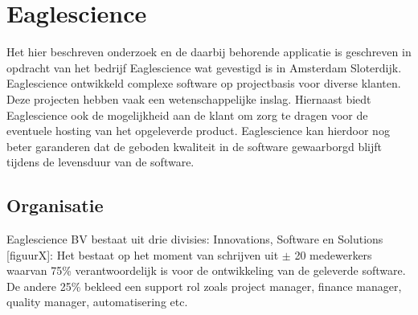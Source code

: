 \chapter{Eaglescience} %

\label{ch:Eaglescience} %


Het hier beschreven onderzoek en de daarbij behorende applicatie is geschreven in opdracht van het bedrijf Eaglescience wat gevestigd is in Amsterdam Sloterdijk. Eaglescience ontwikkeld complexe software op projectbasis voor diverse klanten. Deze projecten hebben vaak een wetenschappelijke inslag. Hiernaast biedt Eaglescience ook de mogelijkheid aan de klant om zorg te dragen voor de eventuele hosting van het opgeleverde product. Eaglescience kan hierdoor nog beter garanderen dat de geboden kwaliteit in de software gewaarborgd blijft tijdens de levensduur van de software.

\section{Organisatie}

Eaglescience BV bestaat uit drie divisies: Innovations, Software en Solutions [figuurX]: %
Het bestaat op het moment van schrijven uit $\pm$ 20 medewerkers waarvan 75\% verantwoordelijk is voor de ontwikkeling van de geleverde software. De andere 25\% bekleed een support rol zoals project manager, finance manager, quality manager, automatisering etc. \\

